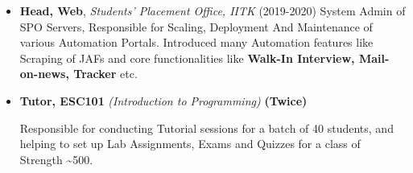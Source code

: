 
\begin{itemize}
\item \textbf{Head, Web}, \emph{Students' Placement Office, IITK} (2019-2020)
	System Admin of SPO Servers, Responsible for Scaling, Deployment And Maintenance of various Automation Portals. Introduced many Automation features like Scraping of JAFs and core functionalities like \textbf{Walk-In Interview, Mail-on-news, Tracker} etc. 

\item \textbf{Tutor, ESC101} \emph{(Introduction to Programming)} \textbf{(Twice)}

   Responsible for conducting Tutorial sessions for a batch of 40 students, and helping to set up Lab Assignments, Exams and Quizzes for a class of Strength \textasciitilde 500.
  

\end{itemize}
\vspace{-1mm}
